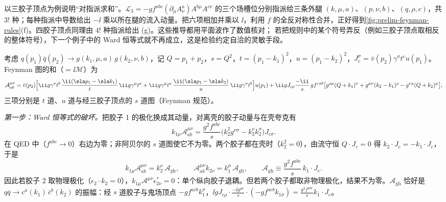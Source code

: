 以三胶子顶点为例说明“对指派求和”。$\mathcal L_3=-gf^{abc}(\partial_\mu A^a_\nu)A^{b\mu}A^{c\nu}$ 的三个场槽位分别指派给三条外腿 $(k,\mu,a)$、$(p,\nu,b)$、$(q,\rho,c)$，共 $3!$ 种；每种指派中导数给出 $-\ii$ 乘以所在腿的流入动量。把六项相加并乘以 $\ii$，利用 $f$ 的全反对称性合并，正好得到\cref{fig:prelim-feynman-rules}(f)。四胶子顶点同理由 $4!$ 种指派给出 (g)。这些推导都用平面波作了数值核对；%
若把规则中的某个符号弄反（例如三胶子顶点取相反的整体符号），下一个例子中的 Ward 恒等式就不再成立，这是检验约定自洽的灵敏手段。

\begin{example}\label{ex:qcd-qqbar-gg}
考虑 $q(p_1)\bar q(p_2)\to g(k_1,\mu,a)\,g(k_2,\nu,b)$，记 $Q=p_1+p_2$，$s=Q^2$，$t=(p_1-k_1)^2$，$u=(p_1-k_2)^2$，$J^\sigma_c=\bar v(p_2)\gamma^\sigma t^cu(p_1)$。Feynman 图的和（$=\ii\mathcal M$）为
\[
\mathcal A^{\mu\nu}_{ab}=\bar v(p_2)\Big[\ii g\gamma^\nu t^b\,\frac{\ii(\sla p_1-\sla k_1)}{t}\,\ii g\gamma^\mu t^a+\ii g\gamma^\mu t^a\,\frac{\ii(\sla p_1-\sla k_2)}{u}\,\ii g\gamma^\nu t^b\Big]u(p_1)
+\ii gJ_{c\rho}\frac{-\ii}{s}\,gf^{cab}\big[g^{\rho\mu}(Q+k_1)^\nu+g^{\mu\nu}(k_2-k_1)^\rho-g^{\nu\rho}(Q+k_2)^\mu\big],
\]
三项分别是 $t$ 道、$u$ 道与经三胶子顶点的 $s$ 道图（Feynman 规范）。

\emph{第一步：Ward 恒等式的破坏。}把胶子 1 的极化换成其动量，对离壳的胶子动量与在壳夸克有 %
\begin{equation}\label{eq:qcd-qqgg-ward}
k_{1\mu}\mathcal A^{\mu\nu}_{ab}=\frac{g^2f^{abc}}{s}\big(k_2^2g^{\nu\sigma}-k_2^\nu k_2^\sigma\big)J_{c\sigma}.
\end{equation}
在 QED 中（$f^{abc}\to0$）右边为零；非阿贝尔的 $s$ 道图使它不为零。两个胶子都在壳时（$k_2^2=0$），由流守恒 $Q\cdot J_c=0$ 得 $k_2\cdot J_c=-k_1\cdot J_c$，于是
\begin{equation}\label{eq:qcd-qqgg-onshell}
k_{1\mu}\mathcal A^{\mu\nu}_{ab}=k_2^\nu\,\mathcal A_{\mathrm{gh}},\qquad \mathcal A^{\mu\nu}_{ab}k_{2\nu}=k_1^\mu\,\mathcal A_{\mathrm{gh}},\qquad \mathcal A_{\mathrm{gh}}\equiv\frac{g^2f^{abc}}{s}\,k_1\cdot J_c .
\end{equation}
因此若胶子 2 取物理极化（$\epsilon_2\cdot k_2=0$），$k_{1\mu}\mathcal A^{\mu\nu}\epsilon^*_{2\nu}=0$：单个纵向胶子退耦。但若两个胶子都取非物理极化，结果不为零。$\mathcal A_{\mathrm{gh}}$ 恰好是 $q\bar q\to c^a(k_1)\,\bar c^b(k_2)$ 的振幅：经 $s$ 道胶子与鬼场顶点 $-gf^{acb}k_1^\sigma$，$\ii gJ_{c\rho}\cdot\frac{-\ii g^{\rho\sigma}}s\cdot(-gf^{acb}k_{1\sigma})=\frac{g^2f^{abc}}sk_1\cdot J_c$。


\end{example}
